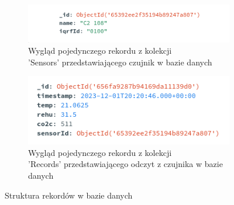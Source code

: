 \begin{figure}[H]
\begin{subfigure}{0.5\textwidth}
    \centering
    \includegraphics[width=\linewidth]{zdj/app/db-sensor.png}
    \caption{Wygląd pojedynczego rekordu z kolekcji\\ 'Sensors' przedstawiającego czujnik w bazie danych}
\end{subfigure}
\hspace{1cm}
\begin{subfigure}{0.5\textwidth}
    \centering
    \includegraphics[width=0.8\linewidth]{zdj/app/db-reading.png}
    \caption{Wygląd pojedynczego rekordu z kolekcji\\ 'Records' przedstawiającego odczyt z czujnika w bazie danych}
\end{subfigure}
   
\caption{Struktura rekordów w bazie danych}
\label{db-records}
\end{figure}


